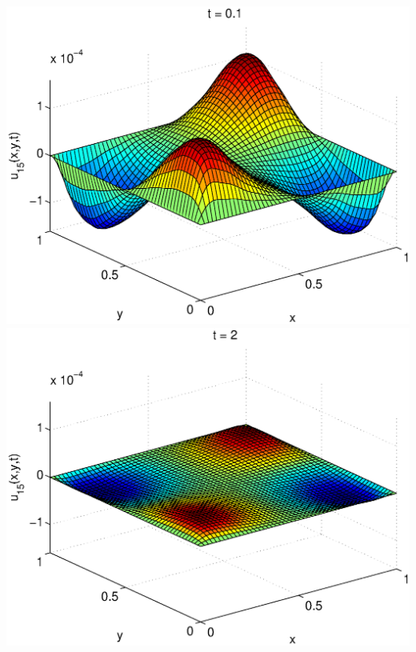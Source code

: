\begin{solution}
\begin{enumerate}
\includegraphics[scale=0.4]{heat2d3}
\includegraphics[scale=0.4]{heat2d4}


\end{enumerate}
\end{solution}